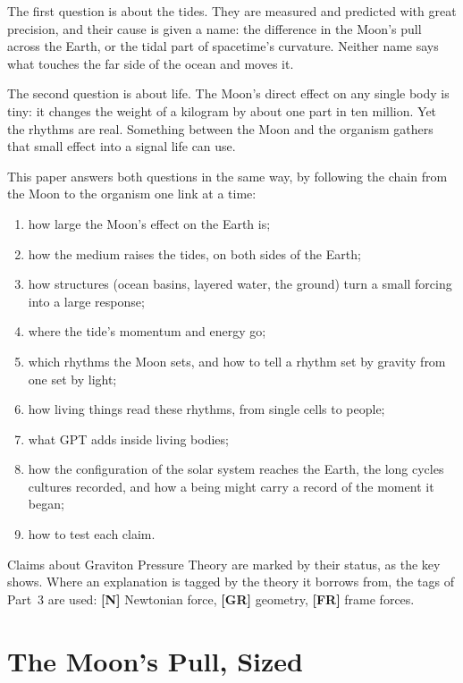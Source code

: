 \documentclass[11pt,a4paper]{article}
\newcommand{\reg}[1]{\textsf{\small\textbf{[#1]}}}
\newcommand{\RN}{\reg{N}}
\newcommand{\RGR}{\reg{GR}}
\newcommand{\RFR}{\reg{FR}}
\begin{document}
The first question is about the tides. They are measured and predicted with great precision, and their cause is given a name: the difference in the Moon's pull across the Earth, or the tidal part of spacetime's curvature. Neither name says what touches the far side of the ocean and moves it.

The second question is about life. The Moon's direct effect on any single body is tiny: it changes the weight of a kilogram by about one part in ten million. Yet the rhythms are real. Something between the Moon and the organism gathers that small effect into a signal life can use.

This paper answers both questions in the same way, by following the chain from the Moon to the organism one link at a time:
\begin{enumerate}
    \item how large the Moon's effect on the Earth is;
    \item how the medium raises the tides, on both sides of the Earth;
    \item how structures (ocean basins, layered water, the ground) turn a small forcing into a large response;
    \item where the tide's momentum and energy go;
    \item which rhythms the Moon sets, and how to tell a rhythm set by gravity from one set by light;
    \item how living things read these rhythms, from single cells to people;
    \item what GPT adds inside living bodies;
    \item how the configuration of the solar system reaches the Earth, the long cycles cultures recorded, and how a being might carry a record of the moment it began;
    \item how to test each claim.
\end{enumerate}

Claims about Graviton Pressure Theory are marked by their status, as the key shows. Where an explanation is tagged by the theory it borrows from, the tags of Part~3 are used: \RN{} Newtonian force, \RGR{} geometry, \RFR{} frame forces.

\statuskey

\section{The Moon's Pull, Sized}
\label{sec:sized}
\end{document}
